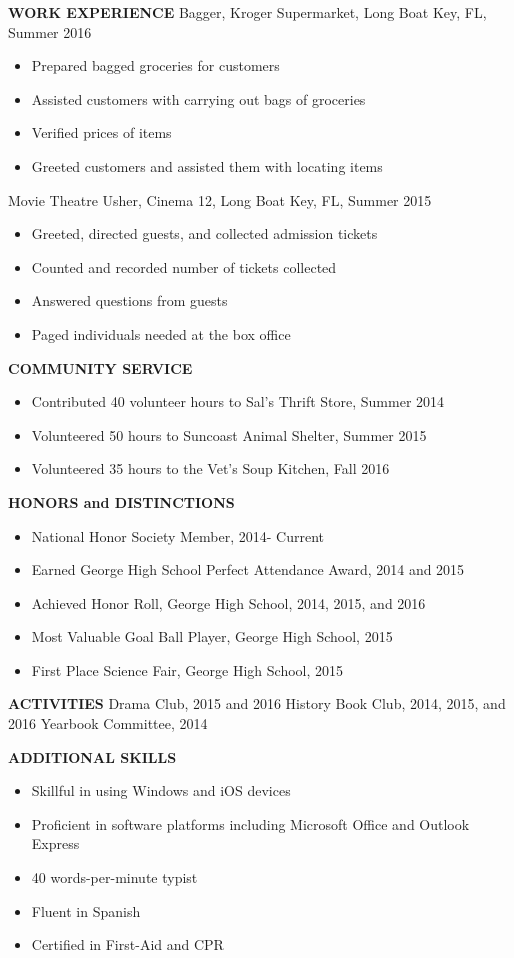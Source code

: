 \textbf{WORK EXPERIENCE}
\break Bagger, Kroger Supermarket, Long Boat Key, FL, Summer 2016
\begin{itemize}
\item Prepared bagged groceries for customers
\item Assisted customers with carrying out bags of groceries
\item Verified prices of items
\item Greeted customers and assisted them with locating items 
\end{itemize}
Movie Theatre Usher, Cinema 12, Long Boat Key, FL, Summer 2015
\begin{itemize}
\item Greeted, directed guests, and collected admission tickets
\item Counted and recorded number of tickets collected
\item Answered questions from guests
\item Paged individuals needed at the box office
\end{itemize}

\textbf{COMMUNITY SERVICE}
\begin{itemize}
\item Contributed 40 volunteer hours to Sal's Thrift Store, Summer 2014
\item Volunteered 50 hours to Suncoast Animal Shelter, Summer 2015
\item Volunteered 35 hours to the Vet's Soup Kitchen, Fall 2016
\end{itemize}

\textbf{HONORS and DISTINCTIONS}
\begin{itemize}
\item National Honor Society Member, 2014- Current
\item Earned George High School Perfect Attendance Award, 2014 and 2015
\item Achieved Honor Roll, George High School, 2014, 2015, and 2016
\item Most Valuable Goal Ball Player, George High School, 2015
\item First Place Science Fair, George High School, 2015
\end{itemize}

\textbf{ACTIVITIES}
\break Drama Club, 2015 and 2016
\break History Book Club, 2014, 2015, and 2016
\break Yearbook Committee, 2014

\textbf{ADDITIONAL SKILLS}
\begin{itemize}
\item Skillful in using Windows and iOS devices
\item Proficient in software platforms including Microsoft Office and Outlook Express
\item 40 words-per-minute typist
\item Fluent in Spanish
\item Certified in First-Aid and CPR
\end{itemize}

